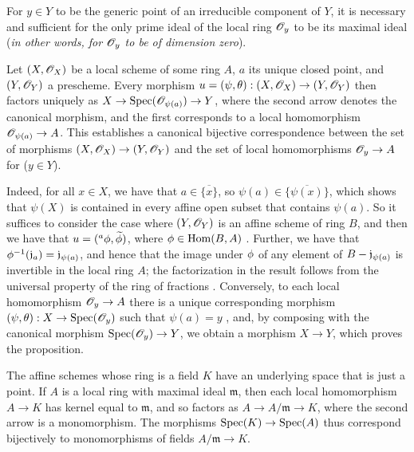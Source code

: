 \begin{corollary}[2.4.3]
\label{I.2.4.3}
For $y\in Y$ to be the generic point of an irreducible component of $Y$, it is necessary and sufficient for the only prime ideal of the local ring $\mathscr{O}_y$ to be its maximal ideal (\emph{in other words, for $\mathscr{O}_y$ to be of \emph{dimension zero}}).
\end{corollary}

\begin{proposition}[2.4.4]
\label{I.2.4.4}
Let $(X,\mathscr{O}_X)$ be a local scheme of some ring $A$, $a$ its unique closed point, and $(Y,\mathscr{O}_Y)$ a prescheme.
Every morphism $u=(\psi,\theta):(X,\sh{O}_X)\to(Y,\sh{O}_Y)$ then factors uniquely as $X\to\Spec(\sh{O}_{\psi(a)})\to Y$, where the second arrow denotes the canonical morphism, and the first corresponds to a local homomorphism $\sh{O}_{\psi(a)}\to A$.
This establishes a canonical bijective correspondence between the set of morphisms $(X,\sh{O}_X)\to(Y,\sh{O}_Y)$ and the set of local homomorphisms $\sh{O}_y\to A$ for ($y\in Y$).
\end{proposition}

Indeed, for all $x\in X$, we have that $a\in\overline{\{x\}}$, so $\psi(a)\in\overline{\{\psi(x)\}}$, which shows that $\psi(X)$ is contained in every affine open subset that contains $\psi(a)$.
So it suffices to consider the case where $(Y,\mathscr{O}_Y)$ is an affine scheme of ring $B$, and then we have that $u=({}^a\phi,\widetilde{\phi})$, where $\phi\in\operatorname{Hom}(B,A)$ .
Further, we have that $\phi^{-1}(\mathfrak{j}_a)=\mathfrak{j}_{\psi(a)}$, and hence that the image under $\phi$ of any element of $B-\mathfrak{j}_{\psi(a)}$ is invertible in the local ring $A$;
the factorization in the result follows from the universal property of the ring of fractions .
Conversely, to each local homomorphism $\sh{O}_y\to A$ there is a unique corresponding morphism $(\psi,\theta):X\to\Spec(\sh{O}_y)$ such that $\psi(a)=y$ , and, by composing with the canonical morphism $\Spec(\sh{O}_y)\to Y$, we obtain a morphism $X\to Y$, which proves the proposition.

\begin{env}[2.4.5]
\label{I.2.4.5}
The affine schemes whose ring is a field $K$ have an underlying space that is just a point.
If $A$ is a local ring with maximal ideal $\mathfrak{m}$, then each local homomorphism $A\to K$ has kernel equal to $\mathfrak{m}$, and so factors as $A\to A/\mathfrak{m}\to K$, where the second arrow is a monomorphism.
The morphisms $\Spec(K)\to\Spec(A)$ thus correspond bijectively to monomorphisms of fields $A/\mathfrak{m}\to K$.
\end{env}


